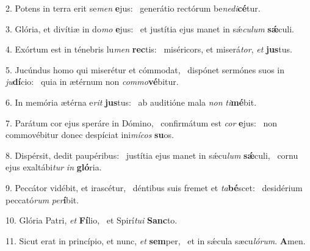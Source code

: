 2. Potens in terra erit se\textit{men} \textbf{e}jus: \ast\  generátio rectórum be\textit{ne}\textit{di}\textbf{cé}tur.\

3. Glória, et divítiæ in do\textit{mo} \textbf{e}jus: \ast\  et justítia ejus manet in sǽ\textit{cu}\textit{lum} \textbf{sǽ}culi.\

4. Exórtum est in ténebris lu\textit{men} \textbf{rec}tis: \ast\  miséricors, et miserá\textit{tor}, \textit{et} \textbf{jus}tus.\

5. Jucúndus homo qui miserétur et cómmodat, \dag\  dispónet sermónes suos in \textit{ju}\textbf{dí}cio: \ast\  quia in ætérnum non \textit{com}\textit{mo}\textbf{vé}bitur.\

6. In memória ætérna e\textit{rit} \textbf{jus}tus: \ast\  ab auditióne mala \textit{non} \textit{ti}\textbf{mé}bit.\

7. Parátum cor ejus speráre in Dómino, \dag\  confirmátum est \textit{cor} \textbf{e}jus: \ast\  non commovébitur donec despíciat ini\textit{mí}\textit{cos} \textbf{su}os.\

8. Dispérsit, dedit paupéribus: \dag\  justítia ejus manet in sǽcu\textit{lum} \textbf{sǽ}culi, \ast\  cornu ejus exaltábi\textit{tur} \textit{in} \textbf{gló}ria.\

9. Peccátor vidébit, et irascétur, \dag\  déntibus suis fremet et \textit{ta}\textbf{bé}scet: \ast\  desidérium peccató\textit{rum} \textit{per}\textbf{í}bit.\

10. Glória Patri, \textit{et} \textbf{Fí}lio, \ast\  et Spirí\textit{tu}\textit{i} \textbf{Sanc}to.\

11. Sicut erat in princípio, et nunc, \textit{et} \textbf{sem}per, \ast\  et in sǽcula sæcu\textit{ló}\textit{rum}. \textbf{A}men.\

